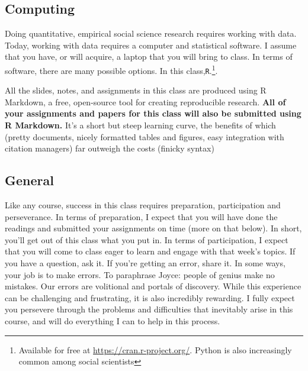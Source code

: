 \subsection{Computing}

Doing quantitative, empirical social science research requires working with data. Today, working with data requires a computer and statistical software. I assume that you have, or will acquire, a laptop that you will bring to class. In terms of software, there are many possible options. In this class,\texttt{R}.\footnote{Available for free at \url{https://cran.r-project.org/}. Python is also increasingly common among social scientists}. 

All the slides, notes, and assignments in this class are produced using R Markdown, a free, open-source tool for creating reproducible research. \textbf{All of your assignments and papers for this class will also be submitted using R Markdown.}  It's a short but steep learning curve, the benefits of which (pretty documents, nicely formatted tables and figures, easy integration with citation managers) far outweigh the costs (finicky syntax)

\subsection{General}  

Like any course, success in this class requires preparation, participation and perseverance. In terms of preparation, I expect that you will have done the readings and submitted your assignments on time (more on that below). In short, you'll get out of this class what you put in. In terms of participation, I expect that you will come to class eager to learn and engage with that week's topics. If you have a question, ask it. If you're getting an error, share it. In some ways, your job is to make errors. To paraphrase Joyce: people of genius make no mistakes. Our errors are volitional and portals of discovery. While this experience can be challenging and frustrating, it is also incredibly rewarding. I fully expect you persevere through the problems and difficulties that inevitably arise in this course, and will do everything I can to help in this process.


